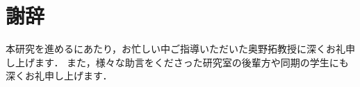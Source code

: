 \pagestyle{plain}
\chapter*{謝辞}

本研究を進めるにあたり，お忙しい中ご指導いただいた奥野拓教授に深くお礼申し上げます．
また，様々な助言をくださった研究室の後輩方や同期の学生にも深くお礼申し上げます．
